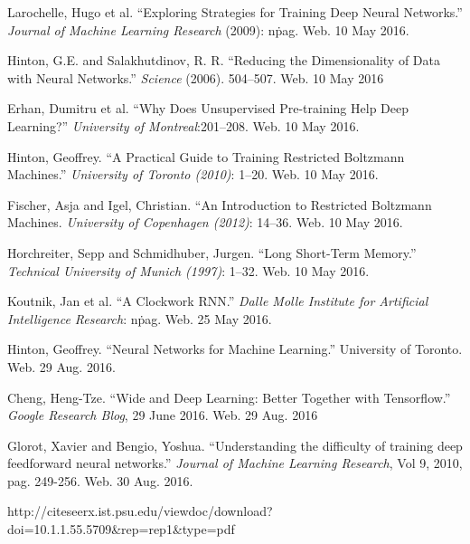 \documentclass{article}
\begin{document}
\begin{thebibliography}{9}
		Larochelle, Hugo et al. ``Exploring Strategies for Training Deep Neural
		Networks.'' \textit{Journal of Machine Learning Research} (2009): n\. pag.
		Web. 10 May 2016.

		Hinton, G.E. and Salakhutdinov, R. R. ``Reducing the Dimensionality of
		Data with Neural Networks.'' \textit{Science} (2006). 504--507. Web. 10
		May 2016

		Erhan, Dumitru et al. ``Why Does Unsupervised Pre-training Help Deep
		Learning?'' \textit{University of Montreal}:201--208. Web. 10 May 2016.

		Hinton, Geoffrey. ``A Practical Guide to Training Restricted Boltzmann
		Machines.'' \textit{University of Toronto (2010)}: 1--20. Web. 10 May
		2016.

		Fischer, Asja and Igel, Christian. ``An Introduction to Restricted
		Boltzmann Machines. \textit{University of Copenhagen (2012)}: 14--36. Web.
		10 May 2016.

		Horchreiter, Sepp and Schmidhuber, Jurgen. ``Long Short-Term Memory.''
		\textit{Technical University of Munich (1997)}: 1--32. Web. 10 May 2016.

		Koutnik, Jan et al. ``A Clockwork RNN.'' \textit{Dalle Molle Institute
		for Artificial Intelligence Research}: n\. pag. Web. 25 May 2016.

		Hinton, Geoffrey. ``Neural Networks for Machine Learning.'' University
		of Toronto. Web. 29 Aug. 2016.

		Cheng, Heng-Tze. ``Wide and Deep Learning: Better Together with
		Tensorflow.'' \textit{Google Research Blog}, 29 June 2016. Web. 29 Aug.
		2016

		Glorot, Xavier and Bengio, Yoshua. ``Understanding the difficulty of
		training deep feedforward neural networks.'' \textit{Journal of Machine
		Learning Research}, Vol 9, 2010, pag. 249-256. Web. 30 Aug. 2016.

http://citeseerx.ist.psu.edu/viewdoc/download?doi=10.1.1.55.5709&rep=rep1&type=pdf

\end{thebibliography}
\end{document}
